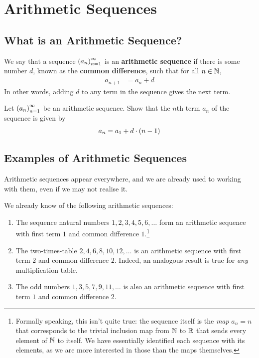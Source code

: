 \section{Arithmetic Sequences}

\subsection{What is an Arithmetic Sequence?}

\begin{definition}
    We say that a sequence $\left( a_n \right)_{n=1}^{\infty}$ is an \textbf{arithmetic sequence} if there is some number $d$, known as the \textbf{common difference}, such that for all $n \in \mathbb{N}$,
    \begin{align}
        a_{n+1} &= a_n + d
    \end{align}
    In other words, adding $d$ to any term in the sequence gives the next term.
\end{definition}

\begin{boxexercise}
Let $\left( a_n \right)_{n=1}^{\infty}$ be an arithmetic sequence. Show that the $n$th term $a_n$ of the sequence is given by
\begin{align}
    a_n = a_1 + d \cdot \left( n - 1 \right)
\end{align}
\end{boxexercise}

\subsection{Examples of Arithmetic Sequences}

Arithmetic sequences appear everywhere, and we are already used to working with them, even if we may not realise it.

\begin{example}
We already know of the following arithmetic sequences:
\begin{enumerate}[noitemsep]
    \item The sequence natural numbers $1,2,3,4,5,6,\ldots$ form an arithmetic sequence with first term $1$ and common difference $1$.\footnote{Formally speaking, this isn't quite true: the sequence itself is the \textit{map} $a_n = n$ that corresponds to the trivial inclusion map from $\mathbb{N}$ to $\mathbb{R}$ that sends every element of $\mathbb{N}$ to itself. We have essentially identified each sequence with its elements, as we are more interested in those than the maps themselves.}
    \item The two-times-table $2, 4, 6, 8, 10, 12, \ldots$ is an arithmetic sequence with first term $2$ and common difference $2$. Indeed, an analogous result is true for \textit{any} multiplication table.
    \item The odd numbers $1, 3, 5, 7, 9, 11, \ldots$ is also an arithmetic sequence with first term $1$ and common difference $2$.
\end{enumerate}
\end{example}

